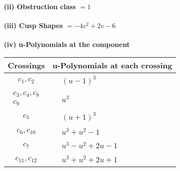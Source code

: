 \documentclass[1p]{elsarticle_modified}
\theoremstyle{definition}
\begin{document}
\flushleft \textbf{(ii) Obstruction class $= 1$}\\~\\
\flushleft \textbf{(iii) Cusp Shapes $= -4 v^2+2 v-6$}\\~\\
\newpage\renewcommand{\arraystretch}{1}
\flushleft \textbf{(iv) u-Polynomials at the component}\newline \\
\begin{tabular}{m{50pt}|m{274pt}}
Crossings & \hspace{64pt}u-Polynomials at each crossing \\
\hline $$\begin{aligned}c_{1},c_{2}\end{aligned}$$&$\begin{aligned}
&(u-1)^3
\end{aligned}$\\
\hline $$\begin{aligned}c_{3},c_{4},c_{8}\\c_{9}\end{aligned}$$&$\begin{aligned}
&u^3
\end{aligned}$\\
\hline $$\begin{aligned}c_{5}\end{aligned}$$&$\begin{aligned}
&(u+1)^3
\end{aligned}$\\
\hline $$\begin{aligned}c_{6},c_{10}\end{aligned}$$&$\begin{aligned}
&u^3+u^2-1
\end{aligned}$\\
\hline $$\begin{aligned}c_{7}\end{aligned}$$&$\begin{aligned}
&u^3- u^2+2 u-1
\end{aligned}$\\
\hline $$\begin{aligned}c_{11},c_{12}\end{aligned}$$&$\begin{aligned}
&u^3+u^2+2 u+1
\end{aligned}$\\
\hline
\end{tabular}\\~\\
\end{document}
